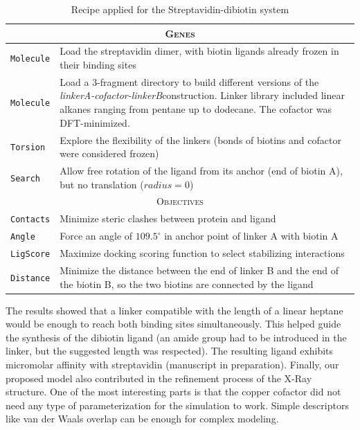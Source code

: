 \begin{table}[hbtp]
	\caption{Recipe applied for the Streptavidin-dibiotin system}
	\label{table:strep-recipe}
	\footnotesize
	\newcommand{\tableheading}[1]{\multicolumn{2}{c}{\textsc{#1}}}
	\begin{tabularx}{\textwidth}{RL}
		\toprule
		\tableheading{Genes}\\
		\toprule
		\texttt{Molecule} & Load the streptavidin dimer, with biotin ligands already frozen in their binding sites  \\
		\midrule
		\texttt{Molecule} & Load a 3-fragment directory to build different versions of the \textit{linkerA-cofactor-linkerB}construction. Linker library included linear alkanes ranging from pentane up to dodecane. The cofactor was DFT-minimized. \\
		\midrule
		\texttt{Torsion} & Explore the flexibility of the linkers (bonds of biotins and cofactor were considered frozen) \\
		\midrule
		\texttt{Search} & Allow free rotation of the ligand from its anchor (end of biotin A), but no translation ($radius=0$) \\
		\toprule
		\tableheading{Objectives}\\
		\toprule
		\texttt{Contacts} & Minimize steric clashes between protein and ligand \\
		\midrule
		\texttt{Angle} & Force an angle of $109.5^\circ$ in anchor point of linker A with biotin A \\
		\midrule
		\texttt{LigScore} & Maximize docking scoring function to select stabilizing interactions \\
		\midrule
		\texttt{Distance} & Minimize the distance between the end of linker B and the end of the biotin B, so the two biotins are connected by the ligand \\
		\bottomrule
	\end{tabularx}
\end{table}

The results showed that a linker compatible with the length of a linear heptane would be enough to reach both binding sites simultaneously. This helped guide the synthesis of the dibiotin ligand (an amide group had to be introduced in the linker, but the suggested length was respected). The resulting ligand exhibits micromolar affinity with streptavidin (manuscript in preparation). Finally, our proposed model also contributed in the refinement process of the X-Ray structure. One of the most interesting parts is that the copper cofactor did not need any type of parameterization for the simulation to work. Simple descriptors like van der Waals overlap can be enough for complex modeling.

